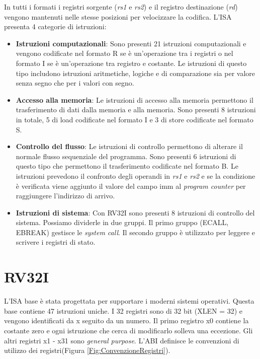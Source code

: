 \documentclass[12pt, a4paper]{report}
\begin{document}
In tutti i formati i registri sorgente (\textit{rs1} e \textit{rs2}) e il registro destinazione (\textit{rd}) vengono mantenuti nelle stesse posizioni per velocizzare la codifica.
L'ISA presenta 4 categorie di istruzioni:
\begin{itemize}
	\item \textbf{Istruzioni computazionali}: Sono presenti 21 istruzioni computazionali e vengono codificate nel formato R se è un'operazione tra i registri o nel formato I se è un'operazione tra registro e costante. Le istruzioni di questo tipo includono istruzioni aritmetiche, logiche e di comparazione sia per valore senza segno che per i valori con segno.
	\item \textbf{Accesso alla memoria}: Le istruzioni di accesso alla memoria permettono il trasferimento di dati dalla memoria e alla memoria. Sono presenti 8 istruzioni in totale, 5 di load codificate nel formato I e 3 di store codificate nel formato S.
	\item \textbf{Controllo del flusso}: Le istruzioni di controllo permettono di alterare il normale flusso sequenziale del programma. Sono presenti 6 istruzioni di questo tipo che permettono il trasferimento codificate nel formato B. Le istruzioni prevedono il confronto degli operandi in \textit{rs1} e \textit{rs2} e se la condizione è verificata viene aggiunto il valore del campo imm al \textit{program counter} per raggiungere l'indirizzo di arrivo.
	\item \textbf{Istruzioni di sistema}: Con RV32I sono presenti 8 istruzioni di controllo del sistema. Possiamo dividerle in due gruppi. Il primo gruppo (ECALL, EBREAK) gestisce le \textit{system call}. Il secondo gruppo è utilizzato per leggere e scrivere i registri di stato.
\end{itemize}


\section{RV32I}
L'ISA base è stata progettata per supportare i moderni sistemi operativi. Questa base contiene 47 istruzioni uniche. I 32 registri sono di 32 bit (XLEN = 32) e vengono identificati da x seguito da un numero. Il primo registro x0 contiene la costante zero e ogni istruzione che cerca di modificarlo solleva una eccezione. Gli altri registri x1 - x31 sono \textit{general purpose}. L'ABI definisce le convenzioni di utilizzo dei registri(Figura \ref{Fig:ConvenzioneRegistri}).
\end{document}
